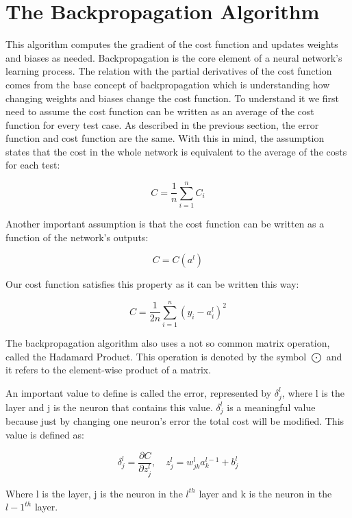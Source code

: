 \documentclass[a4paper, 12pt]{amsart}
\begin{document}
\section{The Backpropagation Algorithm}

This algorithm computes the gradient of the cost function and updates weights
and biases as needed. Backpropagation is the core element of a neural network's
learning process. The relation with the partial derivatives of the cost function
comes from the base concept of backpropagation which is understanding how
changing weights and biases change the cost function. To understand it we first
need to assume the cost function can be written as an average of the cost
function for every test case. As described in the previous section, the error
function and cost function are the same. With this in mind, the assumption
states that the cost in the whole network is equivalent to the average of the
costs for each test:

\begin{equation*}
  C = \frac{1}{n}\sum_{i=1}^{n}C_i
\end{equation*}

Another important assumption is that the cost function can be written as a
function of the network's outputs:

\begin{equation*}
  C = C(a^l)
\end{equation*}

Our cost function satisfies this property as it can be written this way:

\begin{equation*}
  C = \frac{1}{2n}\sum_{i=1}^{n} (y_i-a_i^l)^2
\end{equation*}


The backpropagation algorithm also uses a not so common matrix operation,
called the Hadamard Product. This operation is denoted by the symbol $\bigodot$
and it refers to the element-wise product of a matrix.

An important value to define is called the error, represented by $\delta_j^l$,
where l is the layer and j is the neuron that contains this value. $\delta_j^l$
is a meaningful value because just by changing one neuron's error the total cost
will be modified. This value is defined as:

\begin{equation*}
  \delta_j^l = \frac{\partial C}{\partial z_j^l},\quad
  z^l_j = w_{jk}^la_k^{l-1}+b_j^l
\end{equation*}

Where l is the layer, j is the neuron in the $l^{th}$ layer and k is the neuron
in the $l-1^{th}$ layer.
\end{document}
